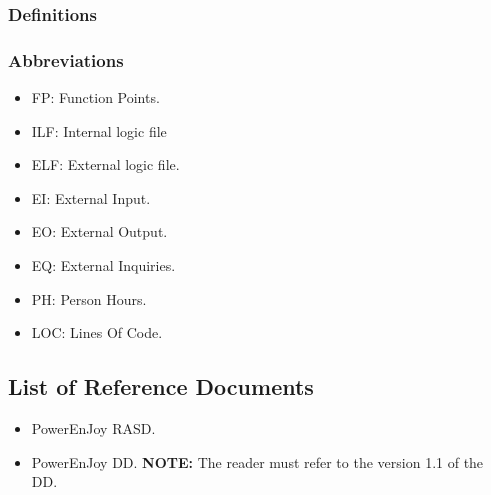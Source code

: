 \subsubsection{Definitions}

\subsubsection{Abbreviations}
\begin{itemize}
	\item  FP: Function Points.
	\item  ILF: Internal logic file
	\item  ELF: External logic file.
	\item  EI: External Input.
	\item  EO: External Output.
	\item  EQ: External Inquiries.
	\item PH: Person Hours.
	\item LOC: Lines Of Code.
\end{itemize}



\subsection{List of Reference Documents}
\begin{itemize}
	\item PowerEnJoy RASD.	
	\item PowerEnJoy DD.
	\textbf{NOTE:} The reader must refer to the version 1.1 of the DD.
\end{itemize}

